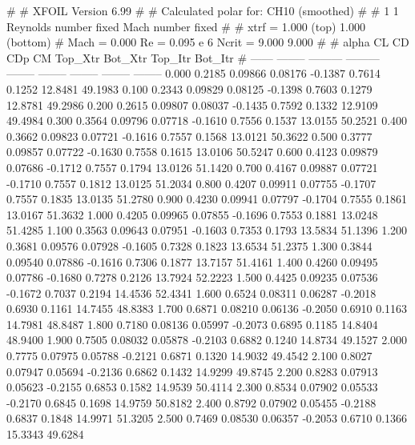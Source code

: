 #  
#       XFOIL         Version 6.99
#  
# Calculated polar for: CH10 (smoothed)                                 
#  
# 1 1 Reynolds number fixed          Mach number fixed         
#  
# xtrf =   1.000 (top)        1.000 (bottom)  
# Mach =   0.000     Re =     0.095 e 6     Ncrit =   9.000  9.000
#  
#   alpha    CL        CD       CDp       CM     Top_Xtr  Bot_Xtr  Top_Itr  Bot_Itr
#  ------ -------- --------- --------- -------- -------- -------- -------- --------
   0.000   0.2185   0.09866   0.08176  -0.1387   0.7614   0.1252  12.8481  49.1983
   0.100   0.2343   0.09829   0.08125  -0.1398   0.7603   0.1279  12.8781  49.2986
   0.200   0.2615   0.09807   0.08037  -0.1435   0.7592   0.1332  12.9109  49.4984
   0.300   0.3564   0.09796   0.07718  -0.1610   0.7556   0.1537  13.0155  50.2521
   0.400   0.3662   0.09823   0.07721  -0.1616   0.7557   0.1568  13.0121  50.3622
   0.500   0.3777   0.09857   0.07722  -0.1630   0.7558   0.1615  13.0106  50.5247
   0.600   0.4123   0.09879   0.07686  -0.1712   0.7557   0.1794  13.0126  51.1420
   0.700   0.4167   0.09887   0.07721  -0.1710   0.7557   0.1812  13.0125  51.2034
   0.800   0.4207   0.09911   0.07755  -0.1707   0.7557   0.1835  13.0135  51.2780
   0.900   0.4230   0.09941   0.07797  -0.1704   0.7555   0.1861  13.0167  51.3632
   1.000   0.4205   0.09965   0.07855  -0.1696   0.7553   0.1881  13.0248  51.4285
   1.100   0.3563   0.09643   0.07951  -0.1603   0.7353   0.1793  13.5834  51.1396
   1.200   0.3681   0.09576   0.07928  -0.1605   0.7328   0.1823  13.6534  51.2375
   1.300   0.3844   0.09540   0.07886  -0.1616   0.7306   0.1877  13.7157  51.4161
   1.400   0.4260   0.09495   0.07786  -0.1680   0.7278   0.2126  13.7924  52.2223
   1.500   0.4425   0.09235   0.07536  -0.1672   0.7037   0.2194  14.4536  52.4341
   1.600   0.6524   0.08311   0.06287  -0.2018   0.6930   0.1161  14.7455  48.8383
   1.700   0.6871   0.08210   0.06136  -0.2050   0.6910   0.1163  14.7981  48.8487
   1.800   0.7180   0.08136   0.05997  -0.2073   0.6895   0.1185  14.8404  48.9400
   1.900   0.7505   0.08032   0.05878  -0.2103   0.6882   0.1240  14.8734  49.1527
   2.000   0.7775   0.07975   0.05788  -0.2121   0.6871   0.1320  14.9032  49.4542
   2.100   0.8027   0.07947   0.05694  -0.2136   0.6862   0.1432  14.9299  49.8745
   2.200   0.8283   0.07913   0.05623  -0.2155   0.6853   0.1582  14.9539  50.4114
   2.300   0.8534   0.07902   0.05533  -0.2170   0.6845   0.1698  14.9759  50.8182
   2.400   0.8792   0.07902   0.05455  -0.2188   0.6837   0.1848  14.9971  51.3205
   2.500   0.7469   0.08530   0.06357  -0.2053   0.6710   0.1366  15.3343  49.6284
